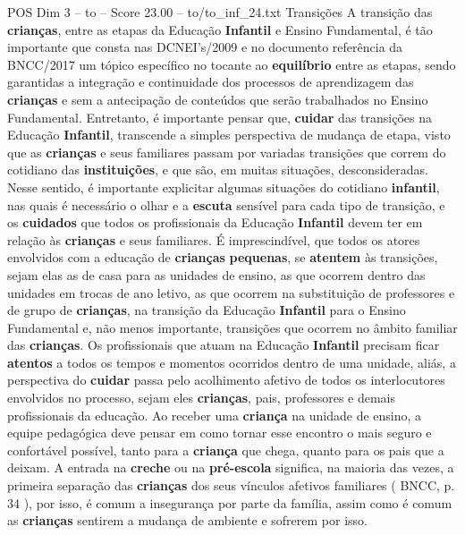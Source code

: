 \begin{textsample}{POS Dim 3 – to – Score 23.00 – to/to\_inf\_24.txt}  \label{ex:f3_pos_107}
Transições A transição das \textbf{crianças}, entre as etapas da Educação \textbf{Infantil} e Ensino Fundamental, é tão importante que consta nas DCNEI’s/2009 e no documento referência da BNCC/2017 um tópico específico no tocante ao \textbf{equilíbrio} entre as etapas, sendo garantidas a integração e continuidade dos processos de aprendizagem das \textbf{crianças} e sem a antecipação de conteúdos que serão trabalhados no Ensino Fundamental.
Entretanto, é importante pensar que, \textbf{cuidar} das transições na Educação \textbf{Infantil}, transcende a simples perspectiva de mudança de etapa, visto que as \textbf{crianças} e seus familiares passam por variadas transições que correm do cotidiano das \textbf{instituições}, e que são, em muitas situações, desconsideradas.
Nesse sentido, é importante explicitar algumas situações do cotidiano \textbf{infantil}, nas quais é necessário o olhar e a \textbf{escuta} sensível para cada tipo de transição, e os \textbf{cuidados} que todos os profissionais da Educação \textbf{Infantil} devem ter em relação às \textbf{crianças} e seus familiares.
É imprescindível, que todos os atores envolvidos com a educação de \textbf{crianças} \textbf{pequenas}, se \textbf{atentem} às transições, sejam elas as de casa para as unidades de ensino, as que ocorrem dentro das unidades em trocas de ano letivo, as que ocorrem na substituição de professores e de grupo de \textbf{crianças}, na transição da Educação \textbf{Infantil} para o Ensino Fundamental e, não menos importante, transições que ocorrem no âmbito familiar das \textbf{crianças}.
Os profissionais que atuam na Educação \textbf{Infantil} precisam ficar \textbf{atentos} a todos os tempos e momentos ocorridos dentro de uma unidade, aliás, a perspectiva do \textbf{cuidar} passa pelo acolhimento afetivo de todos os interlocutores envolvidos no processo, sejam eles \textbf{crianças}, pais, professores e demais profissionais da educação.
Ao receber uma \textbf{criança} na unidade de ensino, a equipe pedagógica deve pensar em como tornar esse encontro o mais seguro e confortável possível, tanto para a \textbf{criança} que chega, quanto para os pais que a deixam.
A entrada na \textbf{creche} ou na \textbf{pré-escola} significa, na maioria das vezes, a primeira separação das \textbf{crianças} dos seus vínculos afetivos familiares ( BNCC, p. 34 ), por isso, é comum a insegurança por parte da família, assim como é comum as \textbf{crianças} sentirem a mudança de ambiente e sofrerem por isso.

\end{textsample}
